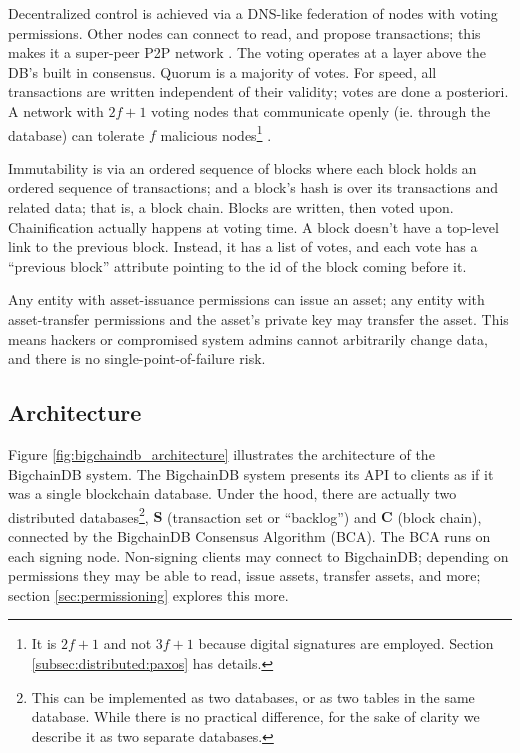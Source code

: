Decentralized control is achieved via a DNS-like federation of nodes with voting permissions.
Other nodes can connect to read, and propose transactions; this makes it a super-peer P2P network \cite{ozsu2011principles}.
The voting operates at a layer above the DB’s built in consensus.
Quorum is a majority of votes.
For speed, all transactions are written independent of their validity; votes are done a posteriori.
A network with $2f+1$ voting nodes that communicate openly (ie. through the database) can tolerate $f$ malicious nodes\footnote{It is $2f+1$ and not $3f+1$ because digital signatures are employed. Section \ref{subsec:distributed:paxos} has details.} \cite{lamport1982byzantine}.

Immutability is via an ordered sequence of blocks where each block holds an ordered sequence of transactions; and a block’s hash is over its transactions and related data; that is, a block chain.
Blocks are written, then voted upon.
Chainification actually happens at voting time.
A block doesn't have a top-level link to the previous block.
Instead, it has a list of votes, and each vote has a “previous block” attribute pointing to the id of the block coming before it.

Any entity with asset-issuance permissions can issue an asset; any entity with asset-transfer permissions and the asset’s private key may transfer the asset.
This means hackers or compromised system admins cannot arbitrarily change data, and there is no single-point-of-failure risk.

\subsection{Architecture}
Figure \ref{fig:bigchaindb_architecture} illustrates the architecture of the BigchainDB system.
The BigchainDB system presents its API to clients as if it was a single blockchain database.
Under the hood, there are actually two distributed databases\footnote{This can be implemented as two databases, or as two tables in the same database. While there is no practical difference, for the sake of clarity we describe it as two separate databases.}, $\mathbf{S}$ (transaction set or “backlog”) and $\mathbf{C}$ (block chain), connected by the BigchainDB Consensus Algorithm (BCA).
The BCA runs on each signing node.
Non-signing clients may connect to BigchainDB; depending on permissions they may be able to read, issue assets, transfer assets, and more; section \ref{sec:permissioning} explores this more.


